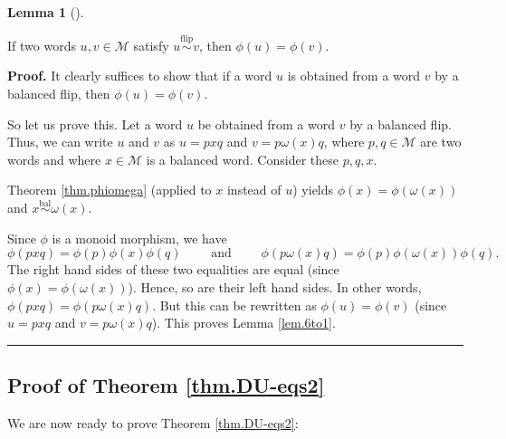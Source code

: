 \documentclass[numbers=enddot,12pt,final,onecolumn,notitlepage]{scrartcl}%
\theoremstyle{definition}
\newtheorem{lem}[theo]{Lemma}
\newenvironment{lemma}[1][]
{\begin{lem}[#1]\begin{leftbar}}
{\end{leftbar}\end{lem}}
\newenvironment{proof}[1][Proof]{\noindent\textbf{#1.} }{\ \rule{0.5em}{0.5em}}
\newcommand{\M}{\mathcal{M}}
\newcommand{\balsim}{\overset{\operatorname*{bal}}{\sim}}
\newcommand{\flipsim}{\overset{\operatorname*{flip}}{\sim}}
\newcommand{\tup}[1]{\left( #1 \right)}
\begin{document}
\begin{lemma}
\label{lem.6to1}
If two words $u,v \in \M$ satisfy $u \flipsim v$, then
$\phi\tup{u} = \phi\tup{v}$.
\end{lemma}

\begin{proof}
It clearly suffices to show that if a word $u$ is obtained from a word $v$ by
a balanced flip, then $\phi\left(  u\right)  =\phi\left(  v\right)  $.

So let us prove this. Let a word $u$ be obtained from a word $v$ by a balanced
flip. Thus, we can write $u$ and $v$ as $u=pxq$ and $v=p\omega\left(
x\right)  q$, where $p,q\in\M$ are two words and where $x\in
\M$ is a balanced word. Consider these $p,q,x$.

Theorem \ref{thm.phiomega} (applied to $x$ instead of $u$) yields $\phi\left(
x\right)  =\phi\left(  \omega\left(  x\right)  \right)  $ and
$x \balsim \omega\left(  x\right)  $.

Since $\phi$ is a monoid morphism, we have 
\[
\phi\left(  pxq\right)
=\phi\left(  p\right)  \phi\left(  x\right)  \phi\left(  q\right)
\qquad \text{ and } \qquad
\phi\left(  p\omega\left(  x\right)  q\right)  =\phi\left(  p\right)
\phi\left(  \omega\left(  x\right)  \right)  \phi\left(  q\right).
\]
The
right hand sides of these two equalities are equal (since $\phi\left(
x\right)  =\phi\left(  \omega\left(  x\right)  \right)  $). Hence, so are
their left hand sides. In other words, $\phi\left(  pxq\right)  =\phi\left(
p\omega\left(  x\right)  q\right)  $. But this can be rewritten as
$\phi\left(  u\right)  =\phi\left(  v\right)  $ (since $u=pxq$ and
$v=p\omega\left(  x\right)  q$). This proves Lemma \ref{lem.6to1}.
\end{proof}

\subsection{Proof of Theorem \ref{thm.DU-eqs2}}

We are now ready to prove Theorem \ref{thm.DU-eqs2}:
\end{document}
